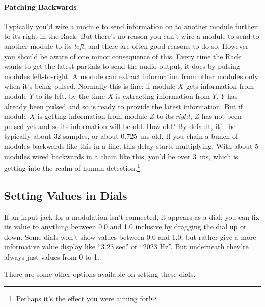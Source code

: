 \documentclass{article}
\begin{document}
\paragraph{Patching Backwards}  Typically you'd wire a module to send information on to another module further to its right in the Rack.  But there's no reason you can't wire a module to send to another module to its {\it left}, and there are often good reasons to do so.  However you should be aware of one minor consequence of this.  Every time the Rack wants to get the latest partials to send the audio output, it does by pulsing modules left-to-right.  A module can extract information from other modules only when it's being pulsed.  Normally this is fine: if module \(X\) gets information from module \(Y\) to its left, by the time \(X\) is extracting information from \(Y\), \(Y\) has already been pulsed and so is ready to provide the latest information.  But if module \(X\) is getting information from module \(Z\) to its {\it right}, \(Z\) has not been pulsed yet and so its information will be old.  How old?  By default, it'll be typically about 32 samples, or about 0.725~ms old.  If you chain a bunch of modules backwards like this in a line, this delay starts multiplying.   With about 5 modules wired backwards in a chain like this, you'd be over 3~ms, which is getting into the realm of human detection.\footnote{Perhaps it's the effect you were aiming for!} 

\subsection{Setting Values in Dials}

If an input jack for a modulation isn't connected, it appears as a dial: you can fix its value to anything between 0.0 and 1.0 inclusive by dragging the dial up or down.  Some dials won't show values between 0.0 and 1.0, but rather give a more informative value display like ``3.23 sec''  or ``2023 Hz''.  But underneath they're always just values from 0 to 1.

There are some other options available on setting these dials.  
\end{document}
